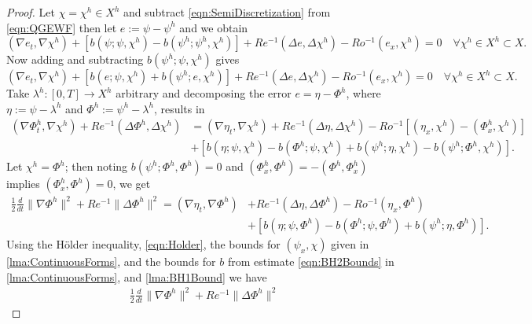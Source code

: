 \begin{proof}
  Let $\chi = \chi^h \in X^h$ and subtract \eqref{eqn:SemiDiscretization} from
  \eqref{eqn:QGEWF} then let $e:=\psi - \psi^h$ and we obtain
  \begin{equation*}
    (\nabla e_t, \nabla \chi^h) + \left[b(\psi;\psi,\chi^h) - b(\psi^h;\psi^h,\chi^h)\right]
      + Re^{-1}(\Delta e, \Delta \chi^h) - Ro^{-1} (e_x, \chi^h) = 0\quad
      \forall \chi^h \in X^h \subset X.
  \end{equation*}
  Now adding and subtracting $b(\psi^h;\psi,\chi^h)$ gives
  \begin{equation*}
    (\nabla e_t, \nabla \chi^h) + \left[b(e;\psi,\chi^h) + b(\psi^h;e,\chi^h)\right]
      + Re^{-1}(\Delta e, \Delta \chi^h) - Ro^{-1} (e_x, \chi^h) = 0\quad
      \forall \chi^h \in X^h \subset X.
  \end{equation*}
  Take $\lambda^h:[0,T] \to X^h$ arbitrary and decomposing the error $e = \eta -
  \Phi^h$, where $\eta := \psi - \lambda^h$ and $\Phi^h := \psi^h - \lambda^h$,
  results in
  \begin{align*}
    (\nabla \Phi^h_t, \nabla \chi^h) + Re^{-1}(\Delta \Phi^h, \Delta \chi^h)
      & = (\nabla \eta_t, \nabla \chi^h) + Re^{-1}(\Delta \eta, \Delta \chi^h)
      - Ro^{-1} \left[(\eta_x, \chi^h) - (\Phi^h_x, \chi^h)\right] \\
    & + \left[ b(\eta;\psi,\chi^h) - b(\Phi^h;\psi,\chi^h)
      + b(\psi^h;\eta,\chi^h) - b(\psi^h;\Phi^h,\chi^h)\right].
  \end{align*}
  Let $\chi^h = \Phi^h$; then noting $b(\psi^h;\Phi^h,\Phi^h) = 0$ and $(\Phi^h_x,
  \Phi^h) = -(\Phi^h,\Phi^h_x)$ implies $(\Phi^h_x,\Phi^h) = 0$, we get
  \begin{align*}
    \frac{1}{2} \frac{d}{dt} \|\nabla \Phi^h\|^2 + Re^{-1}\|\Delta \Phi^h\|^2
       = (\nabla \eta_t, \nabla \Phi^h) &+ Re^{-1}(\Delta \eta, \Delta \Phi^h)
      - Ro^{-1} (\eta_x, \Phi^h) \\
    & + \left[ b(\eta;\psi,\Phi^h) - b(\Phi^h;\psi,\Phi^h)
      + b(\psi^h;\eta,\Phi^h)\right].
  \end{align*}
  Using the H\"older inequality, \eqref{eqn:Holder}, the bounds for $(\psi_x,\chi)$
  given in \autoref{lma:ContinuousForms}, and the bounds for $b$ from estimate
  \eqref{eqn:BH2Bounds} in \autoref{lma:ContinuousForms}, and
  \autoref{lma:BH1Bound} we have
  \begin{equation}
    \begin{split}
      \frac{1}{2} \frac{d}{dt} \|\nabla \Phi^h\|^2 + Re^{-1}\|\Delta \Phi^h\|^2

\end{split}
\end{equation}
\end{proof}

